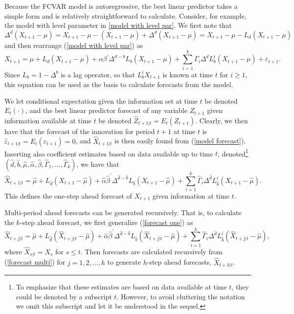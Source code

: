 \documentclass[10pt]{article}
\begin{document}
Because the FCVAR model is autoregressive, the best linear predictor takes a simple form and is relatively straightforward to calculate. Consider, for example, the model with level parameter in \eqref{model with level par}. We first note that
\begin{equation}
\Delta^d (X_{t+1}-\mu) = X_{t+1}-\mu  - (X_{t+1}-\mu) + \Delta^d (X_{t+1}-\mu) = X_{t+1}-\mu - L_d (X_{t+1}-\mu)
\nonumber
\end{equation}
and then rearrange (\ref{model with level par}) as
\begin{equation}
X_{t+1}=\mu + L_d (X_{t+1}-\mu)+\alpha\beta^{\prime}\Delta^{d-b}L_{b}(X_{t+1}-\mu)+\sum
_{i=1}^{k}\Gamma_{i}\Delta^d L_{b}^{i}(X_{t+1}-\mu)+\varepsilon_{t+1}.
\label{model forecast}
\end{equation}
Since $L_{b}=1-\Delta^{b}$ is a lag operator, so that $L_{b}^{i}X_{t+1}$ is known at time $t$ for $i \geq 1$, this equation can be used as the basis to calculate forecasts from the model.

We let conditional expectation given the information set at time $t$ be denoted $E_{t}(\cdot)$, and the best linear predictor forecast of any variable $Z_{t+1}$ given information available at time $t$ be denoted $\hat{Z}_{t+1|t}=E_{t}(Z_{t+1})$. Clearly, we then have that the forecast of the innovation for period $t+1$ at time $t$ is $\hat{\varepsilon}_{t+1|t}=E_{t}(\varepsilon_{t+1})=0$, and $\hat{X}_{t+1|t}$ is then easily found from (\ref{model forecast}). Inserting also coefficient estimates based on data available up to time $t$, denoted\footnote{To emphasize that these estimates are based on data available at time $t$, they could be denoted by a subscript $t$. However, to avoid cluttering the notation we omit this subscript and let it be understood in the sequel.} $(\hat{d},\hat{b},\hat{\mu},\hat{\alpha},\hat{\beta },\hat{\Gamma}_{1},\ldots,\hat{\Gamma}_{k})$, we have that
\begin{equation}
\hat{X}_{t+1|t}=\hat{\mu}+L_{\hat{d}} (X_{t+1}-\hat{\mu})+\hat{\alpha}\hat{\beta}^{\prime}\Delta^{\hat{d}-\hat{b}
}L_{\hat{b}}(X_{t+1}-\hat{\mu})+\sum_{i=1}^{k}\hat{\Gamma}_{i}\Delta^{\hat{d}}
L_{\hat{b}}^{i}(X_{t+1}-\hat{\mu}).
\label{forecast one}
\end{equation}
This defines the one-step ahead forecast of $X_{t+1}$ given information at time $t$. 

Multi-period ahead forecasts can be generated recursively. That is, to calculate the $h$-step ahead forecast, we first generalize (\ref{forecast one}) as
\begin{equation}
\hat{X}_{t+j|t}=\hat{\mu}+L_{\hat{d}} (\hat{X}_{t+j|t}-\hat{\mu})+\hat{\alpha}\hat{\beta}^{\prime}
\Delta^{\hat{d}-\hat{b}}L_{\hat{b}}(\hat{X}_{t+j|t}-\hat{\mu})+\sum_{i=1}^{k}
\hat{\Gamma}_{i}\Delta^{\hat{d}} L_{\hat{b}}^{i}(\hat{X}_{t+j|t}-\hat{\mu}),
\label{forecast multi}
\end{equation}
where $\hat{X}_{s|t}=X_{s}$ for $s\leq t$. Then forecasts are calculated recursively from (\ref{forecast multi}) for $j=1,2,\ldots,h$ to generate $h$-step ahead forecasts, $\hat{X}_{t+h|t}$.
\end{document}
